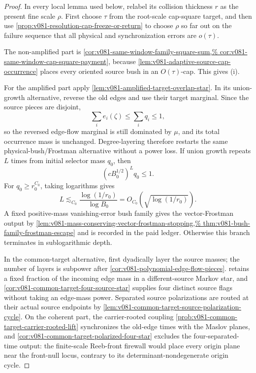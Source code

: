\documentclass[10pt]{article}
\begin{document}
\begin{proof}
In every local lemma used below, relabel its collision thickness \(r\) as the present fine scale
\(\rho\).  First choose \(\tau\) from the root-scale cap-square target, and then use
\cref{prop:v081-resolution-cap-freeze-or-return} to choose \(\rho\) so far out on the failure
sequence that all physical and synchronization errors are \(o(\tau)\).

The non-amplified part is
\cref{cor:v081-same-window-family-square-sum,%
cor:v081-same-window-cap-square-payment}, because
\cref{lem:v081-adaptive-source-cap-occurrence} places every oriented source bush in an
\(O(\tau)\)-cap.  This gives \textnormal{(i)}.

For the amplified part apply
\cref{lem:v081-amplified-target-overlap-star}.  In its union-growth alternative, reverse the old
edges and use their target marginal.  Since the source pieces are disjoint,
\[
\sum_i e_i(\zeta)\le\sum_iq_i\le1,
\]
so the reversed edge-flow marginal is still dominated by \(\mu\), and its total occurrence mass is
unchanged.  Degree-layering therefore restarts the same physical-bush/Frostman alternative without
a power loss.  If union growth repeats \(L\) times from initial selector mass \(q_0\), then
\[
\left(cB_0^{1/2}\right)^Lq_0\le1.
\]
For \(q_0\ge r_0^{C_0}\), taking logarithms gives
\[
L
\lesssim_{C_0}
\frac{\log(1/r_0)}{\log B_0}
=
O_{C_0}\!\left(\sqrt{\log(1/r_0)}\right).
\]
A fixed positive-mass vanishing-error bush family gives the vector-Frostman output by
\cref{lem:v081-mass-conserving-vector-frostman-stopping,%
thm:v081-bush-family-frostman-escape} and is recorded in the paid ledger.  Otherwise this branch
terminates in sublogarithmic depth.

In the common-target alternative, first dyadically layer the source masses; the number of layers is
subpower after
\cref{cor:v081-polynomial-edge-flow-pieces}.   retains a fixed fraction of the incoming edge
mass in a different-source Markov star, and
\cref{cor:v081-common-target-four-source-star} supplies four distinct source flags without taking
an edge-mass power.  Separated source polarizations are routed at their actual source endpoints by
\cref{lem:v081-common-target-source-polarization-cycle}.  On the coherent part, the
carrier-rooted coupling
\cref{prob:v081-common-target-carrier-rooted-lift} synchronizes the old-edge times with the Maslov
planes, and
\cref{cor:v081-common-target-polarized-four-star} excludes the four-separated-time output: the
finite-scale Reeb-front firewall would place every origin plane near the front-null locus, contrary
to its determinant-nondegenerate origin cycle.


\end{proof}
\end{document}
